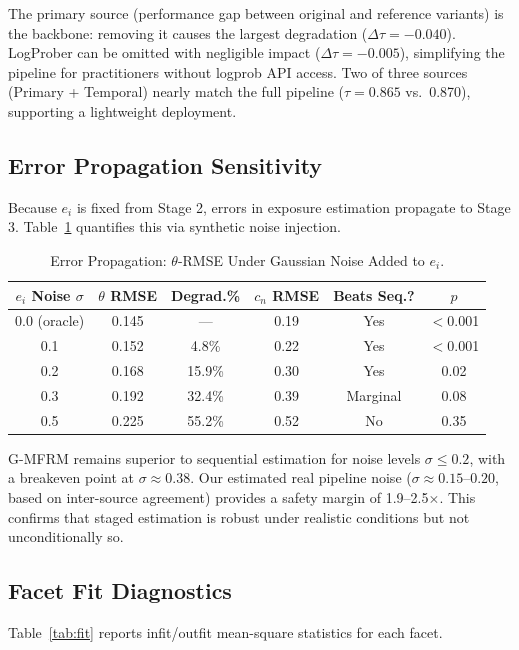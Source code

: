 \documentclass[11pt]{article}
\newcommand{\gmfrm}{G-MFRM}
\newcommand{\cn}{c_n}
\newcommand{\ei}{e_i}
\begin{document}
The primary source (performance gap between original and reference variants) is the backbone: removing it causes the largest degradation ($\Delta\tau = -0.040$).
LogProber can be omitted with negligible impact ($\Delta\tau = -0.005$), simplifying the pipeline for practitioners without logprob API access.
Two of three sources (Primary + Temporal) nearly match the full pipeline ($\tau = 0.865$ vs.\ 0.870), supporting a lightweight deployment.

\subsection{Error Propagation Sensitivity}

Because $\ei$ is fixed from Stage 2, errors in exposure estimation propagate to Stage 3.
Table~\ref{tab:error_prop} quantifies this via synthetic noise injection.

\begin{table}[t]
\centering
\caption{Error Propagation: $\theta$-RMSE Under Gaussian Noise Added to $\ei$.}
\label{tab:error_prop}
\small
\begin{tabular}{cccccc}
\toprule
$\ei$ Noise $\sigma$ & $\theta$ RMSE & Degrad.\% & $\cn$ RMSE & Beats Seq.? & $p$ \\
\midrule
0.0 (oracle) & 0.145 & --- & 0.19 & Yes & $<$0.001 \\
0.1 & 0.152 & 4.8\% & 0.22 & Yes & $<$0.001 \\
0.2 & 0.168 & 15.9\% & 0.30 & Yes & 0.02 \\
0.3 & 0.192 & 32.4\% & 0.39 & Marginal & 0.08 \\
0.5 & 0.225 & 55.2\% & 0.52 & No & 0.35 \\
\bottomrule
\end{tabular}
\end{table}

\gmfrm{} remains superior to sequential estimation for noise levels $\sigma \leq 0.2$, with a breakeven point at $\sigma \approx 0.38$.
Our estimated real pipeline noise ($\sigma \approx 0.15$--$0.20$, based on inter-source agreement) provides a safety margin of 1.9--2.5$\times$.
This confirms that staged estimation is robust under realistic conditions but not unconditionally so.

\subsection{Facet Fit Diagnostics}

Table~\ref{tab:fit} reports infit/outfit mean-square statistics for each facet.
\end{document}
